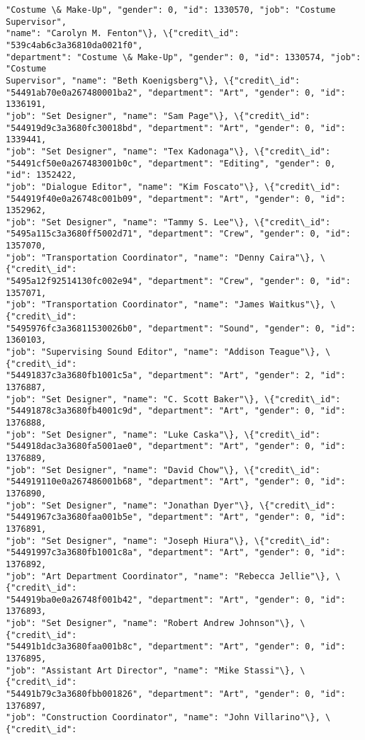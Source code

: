 \documentclass[11pt]{article}
\begin{document}
\begin{tcolorbox}[breakable, size=fbox, boxrule=.5pt, pad at break*=1mm, opacityfill=0]
\begin{Verbatim}[commandchars=\\\{\}]
"Costume \& Make-Up", "gender": 0, "id": 1330570, "job": "Costume Supervisor",
"name": "Carolyn M. Fenton"\}, \{"credit\_id": "539c4ab6c3a36810da0021f0",
"department": "Costume \& Make-Up", "gender": 0, "id": 1330574, "job": "Costume
Supervisor", "name": "Beth Koenigsberg"\}, \{"credit\_id":
"54491ab70e0a267480001ba2", "department": "Art", "gender": 0, "id": 1336191,
"job": "Set Designer", "name": "Sam Page"\}, \{"credit\_id":
"544919d9c3a3680fc30018bd", "department": "Art", "gender": 0, "id": 1339441,
"job": "Set Designer", "name": "Tex Kadonaga"\}, \{"credit\_id":
"54491cf50e0a267483001b0c", "department": "Editing", "gender": 0, "id": 1352422,
"job": "Dialogue Editor", "name": "Kim Foscato"\}, \{"credit\_id":
"544919f40e0a26748c001b09", "department": "Art", "gender": 0, "id": 1352962,
"job": "Set Designer", "name": "Tammy S. Lee"\}, \{"credit\_id":
"5495a115c3a3680ff5002d71", "department": "Crew", "gender": 0, "id": 1357070,
"job": "Transportation Coordinator", "name": "Denny Caira"\}, \{"credit\_id":
"5495a12f92514130fc002e94", "department": "Crew", "gender": 0, "id": 1357071,
"job": "Transportation Coordinator", "name": "James Waitkus"\}, \{"credit\_id":
"5495976fc3a36811530026b0", "department": "Sound", "gender": 0, "id": 1360103,
"job": "Supervising Sound Editor", "name": "Addison Teague"\}, \{"credit\_id":
"54491837c3a3680fb1001c5a", "department": "Art", "gender": 2, "id": 1376887,
"job": "Set Designer", "name": "C. Scott Baker"\}, \{"credit\_id":
"54491878c3a3680fb4001c9d", "department": "Art", "gender": 0, "id": 1376888,
"job": "Set Designer", "name": "Luke Caska"\}, \{"credit\_id":
"544918dac3a3680fa5001ae0", "department": "Art", "gender": 0, "id": 1376889,
"job": "Set Designer", "name": "David Chow"\}, \{"credit\_id":
"544919110e0a267486001b68", "department": "Art", "gender": 0, "id": 1376890,
"job": "Set Designer", "name": "Jonathan Dyer"\}, \{"credit\_id":
"54491967c3a3680faa001b5e", "department": "Art", "gender": 0, "id": 1376891,
"job": "Set Designer", "name": "Joseph Hiura"\}, \{"credit\_id":
"54491997c3a3680fb1001c8a", "department": "Art", "gender": 0, "id": 1376892,
"job": "Art Department Coordinator", "name": "Rebecca Jellie"\}, \{"credit\_id":
"544919ba0e0a26748f001b42", "department": "Art", "gender": 0, "id": 1376893,
"job": "Set Designer", "name": "Robert Andrew Johnson"\}, \{"credit\_id":
"54491b1dc3a3680faa001b8c", "department": "Art", "gender": 0, "id": 1376895,
"job": "Assistant Art Director", "name": "Mike Stassi"\}, \{"credit\_id":
"54491b79c3a3680fbb001826", "department": "Art", "gender": 0, "id": 1376897,
"job": "Construction Coordinator", "name": "John Villarino"\}, \{"credit\_id":

\end{Verbatim}
\end{tcolorbox}
\end{document}
